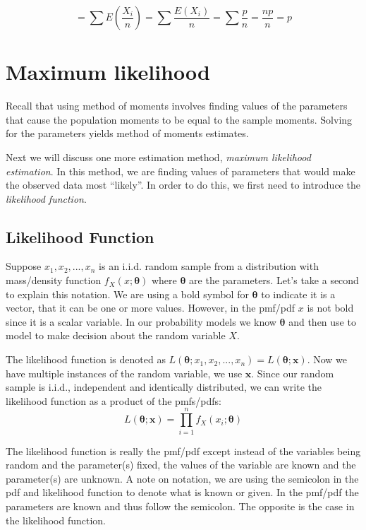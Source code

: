\documentclass[
  letterpaper,
  DIV=11,
  numbers=noendperiod]{scrreprt}
\begin{document}
\[
=  \sum{E\left( \frac{X_i}{n} \right)}= \sum{ \frac{E\left(X_i\right)}{n}}=\sum{\frac{p}{n}}=\frac{np}{n}=p
\]

\section{Maximum likelihood}\label{maximum-likelihood}

Recall that using method of moments involves finding values of the
parameters that cause the population moments to be equal to the sample
moments. Solving for the parameters yields method of moments estimates.

Next we will discuss one more estimation method, \emph{maximum
likelihood estimation}. In this method, we are finding values of
parameters that would make the observed data most ``likely''. In order
to do this, we first need to introduce the \emph{likelihood function}.

\subsection{Likelihood Function}\label{likelihood-function}

Suppose \(x_1,x_2,...,x_n\) is an i.i.d. random sample from a
distribution with mass/density function \(f_{X}(x;\boldsymbol{\theta})\)
where \(\boldsymbol{\theta}\) are the parameters. Let's take a second to
explain this notation. We are using a bold symbol for
\(\boldsymbol{\theta}\) to indicate it is a vector, that it can be one
or more values. However, in the pmf/pdf \(x\) is not bold since it is a
scalar variable. In our probability models we know
\(\boldsymbol{\theta}\) and then use to model to make decision about the
random variable \(X\).

The likelihood function is denoted as
\(L(\boldsymbol{\theta};x_1,x_2,...,x_n) = L(\boldsymbol{\theta};\boldsymbol{x})\).
Now we have multiple instances of the random variable, we use
\(\boldsymbol{x}\). Since our random sample is i.i.d., independent and
identically distributed, we can write the likelihood function as a
product of the pmfs/pdfs: \[
L(\boldsymbol{\theta};\boldsymbol{x})=\prod_{i=1}^n f_X(x_i;\boldsymbol{\theta})
\]

The likelihood function is really the pmf/pdf except instead of the
variables being random and the parameter(s) fixed, the values of the
variable are known and the parameter(s) are unknown. A note on notation,
we are using the semicolon in the pdf and likelihood function to denote
what is known or given. In the pmf/pdf the parameters are known and thus
follow the semicolon. The opposite is the case in the likelihood
function.
\end{document}

